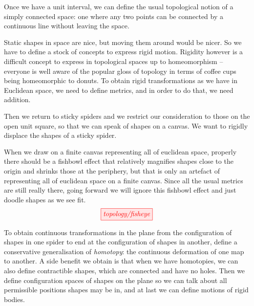 
Once we have a unit interval, we can define the usual topological notion of a simply connected space: one where any two points can be connected by a continuous line without leaving the space.


Static shapes in space are nice, but moving them around would be nicer. So we have to define a stock of concepts to express rigid motion. Rigidity however is a difficult concept to express in topological spaces up to homeomorphism -- everyone is well aware of the popular gloss of topology in terms of coffee cups being homeomorphic to donuts. To obtain rigid transformations as we have in Euclidean space, we need to define metrics, and in order to do that, we need addition.


Then we return to sticky spiders and we restrict our consideration to those on the open unit square, so that we can speak of shapes on a canvas. We want to rigidly displace the shapes of a sticky spider.

\begin{remark}
When we draw on a finite canvas representing all of euclidean space, properly there should be a fishbowl effect that relatively magnifies shapes close to the origin and shrinks those at the periphery, but that is only an artefact of representing all of euclidean space on a finite canvas. Since all the usual metrics are still really there, going forward we will ignore this fishbowl effect and just doodle shapes as we see fit.
\[\tikzfig{topology/fisheye}\]
\end{remark}


To obtain continuous transformations in the plane from the configuration of shapes in one spider to end at the configuration of shapes in another, define a conservative generalisation of \emph{homotopy}: the continuous deformation of one map to another. A side benefit we obtain is that when we have homotopies, we can also define contractible shapes, which are connected and have no holes. Then we define configuration spaces of shapes on the plane so we can talk about all permissible positions shapes may be in, and at last we can define motions of rigid bodies.


